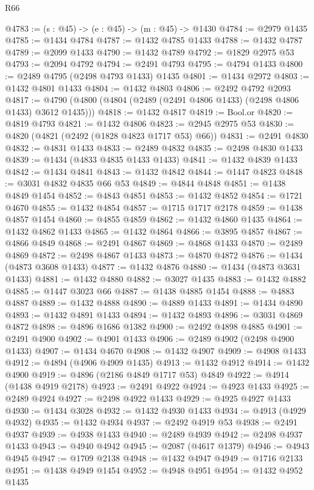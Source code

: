 \begin{lexlean}{R66}
\begin{coremodule}
@4783 := (s : @45) -> (e : @45) -> (m : @45) -> @1430
@4784 := @2979 @1435
@4785 := @1434 @4784
@4787 := @1432 @4785 @1433
@4788 := @1432 @4787
@4789 := @2099 @1433
@4790 := @1432 @4789
@4792 := @1829 @2975 @53
@4793 := @2094 @4792
@4794 := @2491 @4793
@4795 := @4794 @1433
@4800 := @2489 @4795 (@2498 @4793 @1433) @1435
@4801 := @1434 @2972
@4803 := @1432 @4801 @1433
@4804 := @1432 @4803
@4806 := @2492 @4792 @2093
@4817 := @4790 (@4800 (@4804 (@2489 (@2491 @4806 @1433) (@2498 @4806 @1433) @3612 @1435)))
@4818 := @1432 @4817
@4819 := Bool.or
@4820 := @4819 @4793
@4821 := @1432 @4806
@4823 := @2945 @2975 @53
@4830 := @4820 (@4821 (@2492 (@1828 @4823 @1717 @53) @66))
@4831 := @2491 @4830
@4832 := @4831 @1433
@4833 := @2489 @4832
@4835 := @2498 @4830 @1433
@4839 := @1434 (@4833 @4835 @1433 @1433)
@4841 := @1432 @4839 @1433
@4842 := @1434 @4841
@4843 := @1432 @4842
@4844 := @1447 @4823
@4848 := @3031 @4832 @4835 @66 @53
@4849 := @4844 @4848
@4851 := @1438 @4849 @1454
@4852 := @4843 @4851
@4853 := @1432 @4852
@4854 := @1721 @4670
@4855 := @1432 @4854
@4857 := @1715 @1717 @2178
@4859 := @1438 @4857 @1454
@4860 := @4855 @4859
@4862 := @1432 @4860 @1435
@4864 := @1432 @4862 @1433
@4865 := @1432 @4864
@4866 := @3895 @4857
@4867 := @4866 @4849
@4868 := @2491 @4867
@4869 := @4868 @1433
@4870 := @2489 @4869
@4872 := @2498 @4867 @1433
@4873 := @4870 @4872
@4876 := @1434 (@4873 @3608 @1433)
@4877 := @1432 @4876
@4880 := @1434 (@4873 @3631 @1433)
@4881 := @1432 @4880
@4882 := @3027 @1435
@4883 := @1432 @4882
@4885 := @1447 @3023 @66
@4887 := @1438 @4885 @1454
@4888 := @4883 @4887
@4889 := @1432 @4888
@4890 := @4889 @1433
@4891 := @1434 @4890
@4893 := @1432 @4891 @1433
@4894 := @1432 @4893
@4896 := @3031 @4869 @4872
@4898 := @4896 @1686 @1382
@4900 := @2492 @4898 @4885
@4901 := @2491 @4900
@4902 := @4901 @1433
@4906 := @2489 @4902 (@2498 @4900 @1433)
@4907 := @1434 @4670
@4908 := @1432 @4907
@4909 := @4908 @1433
@4912 := @4894 (@4906 @4909 @1435)
@4913 := @1432 @4912
@4914 := @1432 @4900
@4919 := @4896 (@2186 @4849 @1717 @53) @4849
@4922 := @4914 (@1438 @4919 @2178)
@4923 := @2491 @4922
@4924 := @4923 @1433
@4925 := @2489 @4924
@4927 := @2498 @4922 @1433
@4929 := @4925 @4927 @1433
@4930 := @1434 @3028
@4932 := @1432 @4930 @1433
@4934 := @4913 (@4929 @4932)
@4935 := @1432 @4934
@4937 := @2492 @4919 @53
@4938 := @2491 @4937
@4939 := @4938 @1433
@4940 := @2489 @4939
@4942 := @2498 @4937 @1433
@4943 := @4940 @4942
@4945 := @2087 (@4617 @1379)
@4946 := @4943 @4945
@4947 := @1709 @2138
@4948 := @1432 @4947
@4949 := @1716 @2133
@4951 := @1438 @4949 @1454
@4952 := @4948 @4951
@4954 := @1432 @4952 @1435

\end{coremodule}
\end{lexlean}
